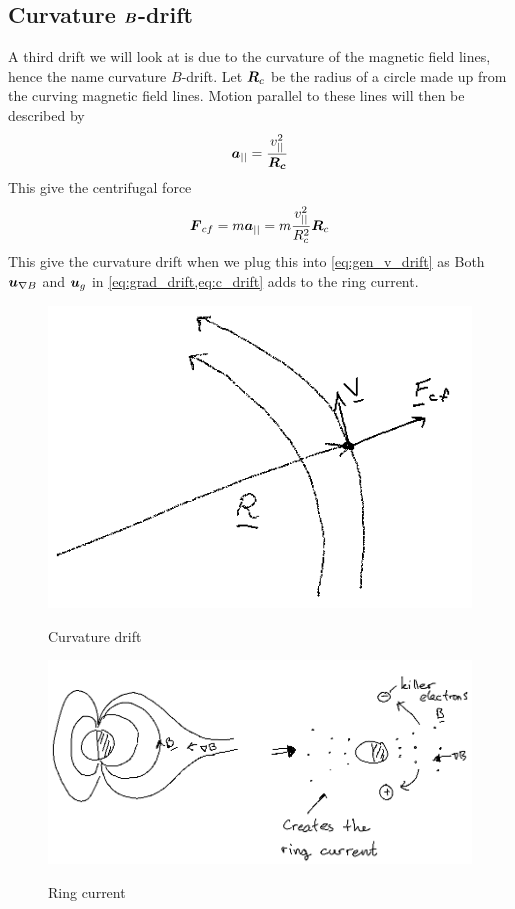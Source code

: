 \subsection{Curvature \(\boldsymbol{B}\)-drift}
A third drift we will look at is due to the curvature of the magnetic field lines, hence the name curvature \(B\)-drift. Let \(\boldsymbol{R}_c\) be the radius of a circle made up from the curving magnetic field lines. Motion parallel to these lines will then be described by
\begin{equation*}
    \boldsymbol{a}_{\vert\vert}=\frac{v^2_{\vert\vert}}{\boldsymbol{R_c}}
\end{equation*}
This give the centrifugal force
\begin{equation*}
    \boldsymbol{F}_{cf}=m\boldsymbol{a}_{\vert\vert}=m\frac{v^2_{\vert\vert}}{R_c^2}\boldsymbol{R}_c
\end{equation*}
This give the curvature drift when we plug this into \cref{eq:gen_v_drift} as
Both \(\boldsymbol{u}_{\nabla B}\) and \(\boldsymbol{u}_{g}\) in \cref{eq:grad_drift,eq:c_drift} adds to the ring current.
\begin{figure}[t]
    \centering
    \includegraphics[width=.4\linewidth]{bilder/curve_drift.png}\label{fig:curve_drift}
    \caption{Curvature drift}
\end{figure}
\begin{figure}[t]
    \centering
    \includegraphics[width=.6\linewidth]{bilder/ring_current.png}\label{fig:ring_current}
    \caption{Ring current}
\end{figure}


